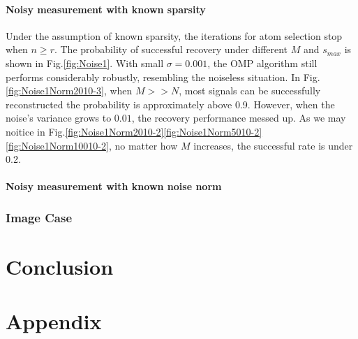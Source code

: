 \documentclass{ucsdreport}
\begin{document}
\paragraph{Noisy measurement with known sparsity} Under the assumption of known sparsity, the iterations for atom selection stop when $n\geq r$. The probability of successful recovery under different $M$ and $s_{max}$ is shown in Fig.\ref{fig:Noise1}. With small $\sigma=0.001$, the OMP algorithm still performs considerably robustly, resembling the noiseless situation. In Fig.\ref{fig:Noise1Norm2010-3}, when $M >> N$, most signals can be successfully reconstructed the probability is approximately above 0.9. However, when the noise's variance grows to $0.01$, the recovery performance messed up. As we may noitice in Fig.\ref{fig:Noise1Norm2010-2}\ref{fig:Noise1Norm5010-2}\ref{fig:Noise1Norm10010-2}, no matter how $M$ increases, the successful rate is under 0.2.
\paragraph{Noisy measurement with known noise norm}
\subsubsection{Image Case}

\section{Conclusion}






\section*{Appendix}
\end{document}
